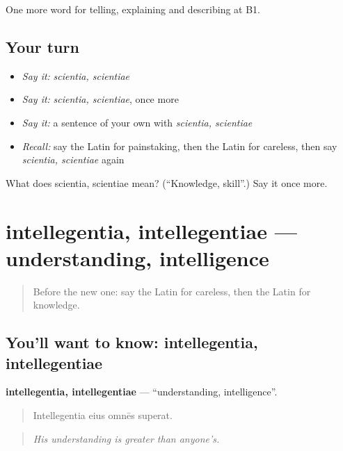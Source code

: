\begin{grammarlens}[title={What you've built}]
One more word for telling, explaining and describing at B1.
\end{grammarlens}

\subsection*{Your turn}
\begin{itemize}
\raggedright
  \item \emph{Say it:} \emph{scientia, scientiae}
  \item \emph{Say it:} \emph{scientia, scientiae}, once more
  \item \emph{Say it:} a sentence of your own with \emph{scientia, scientiae}
  \item \emph{Recall:} say the Latin for painstaking, then the Latin for careless, then say \emph{scientia, scientiae} again
\end{itemize}

\begin{tcolorbox}[breakable,colback=teal!4,colframe=teal!35!black,title={Before you move on}]
What does scientia, scientiae mean? (\textquotedblleft{}Knowledge, skill\textquotedblright{}.) Say it once more.
\end{tcolorbox}
\section[intellegentia, intellegentiae]{intellegentia, intellegentiae — understanding, intelligence}

\label{lesson:LA-C407-intellegentia}



\begin{quote}
Before the new one: say the Latin for careless, then the Latin for knowledge.
\end{quote}

\subsection*{You'll want to know: intellegentia, intellegentiae}
\textbf{intellegentia, intellegentiae} — \textquotedblleft{}understanding, intelligence\textquotedblright{}.

\begin{quote}
Intellegentia eius omnēs superat.
\end{quote}

\begin{quote}
\emph{His understanding is greater than anyone's.}
\end{quote}

